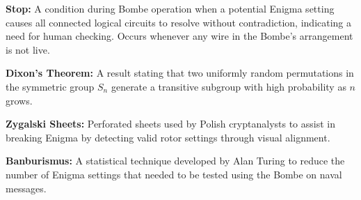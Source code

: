 \documentclass{article}
\begin{document}
\begin{tcolorbox}[colback=white!95!gray, colframe=black!75, boxrule=0.8pt, arc=4pt, width=\textwidth,  title=Glossary, ]
\vspace{1em}
\textbf{Stop:} A condition during Bombe operation when a potential Enigma setting causes all connected logical circuits to resolve without contradiction, indicating a need for human checking. Occurs whenever any wire in the Bombe's arrangement is not live.

\vspace{1em}
\textbf{Dixon's Theorem:} A result stating that two uniformly random permutations in the symmetric group $S_n$ generate a transitive subgroup with high probability as $n$ grows.

\vspace{1em}
\textbf{Zygalski Sheets:} Perforated sheets used by Polish cryptanalysts to assist in breaking Enigma by detecting valid rotor settings through visual alignment.

\vspace{1em}

\textbf{Banburismus:} A statistical technique developed by Alan Turing to reduce the number of Enigma settings that needed to be tested using the Bombe on naval messages.

    \end{tcolorbox}
\end{document}
